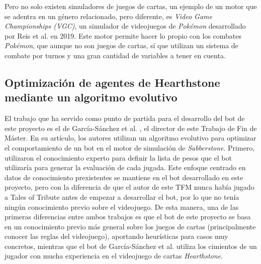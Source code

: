 Pero no solo existen simuladores de juegos de cartas, un ejemplo de un motor que se adentra en un género relacionado, pero diferente, es \textit{Video Game Championships (VGC)}, un simulador de videojuegos de \textit{Pokémon} desarrollado por Reis et al. \cite{simao_reis_vgc_2019} en 2019. Este motor permite hacer lo propio con los combates \textit{Pokémon}, que aunque no son juegos de cartas, sí que utilizan un sistema de combate por turnos y una gran cantidad de variables a tener en cuenta.


\subsection{Optimización de agentes de Hearthstone mediante un algoritmo evolutivo}

El trabajo que ha servido como punto de partida para el desarrollo del bot de este proyecto es el de García-Sánchez et al. \cite{garcia-sanchez_optimizing_2020}, el director de este Trabajo de Fin de Máster. En su artículo, los autores utilizan un algoritmo evolutivo para optimizar el comportamiento de un bot en el motor de simulación de \textit{Sabberstone}. Primero, utilizaron el conocimiento experto para definir la lista de pesos que el bot utilizaría para generar la evaluación de cada jugada. Este enfoque centrado en datos de conocimiento prexistentes se mantiene en el bot desarrollado en este proyecto, pero con la diferencia de que el autor de este TFM nunca había jugado a Tales of Tribute antes de empezar a desarrollar el bot, por lo que no tenía ningún conocimiento previo sobre el videojuego. De esta manera, una de las primeras diferencias entre ambos trabajos es que el bot de este proyecto se basa en un conocimiento previo más general sobre los juegos de cartas (principalmente conocer las reglas del videojuego), aportando heurísticas para casos muy concretos, mientras que el bot de García-Sánchez et al. utiliza los cimientos de un jugador con mucha experiencia en el videojuego de cartas \textit{Hearthstone}.

